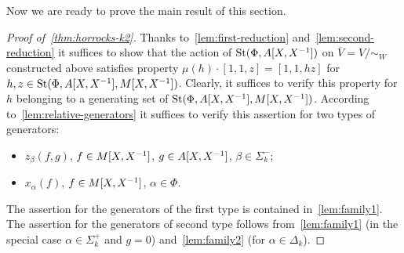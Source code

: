 Now we are ready to prove the main result of this section.
\begin{proof}[Proof of~\cref{thm:horrocks-k2}]
    Thanks to~\cref{lem:first-reduction} and~\cref{lem:second-reduction} it suffices to show that the action of
    $\operatorname{St}(\Phi, A[X, X^{-1}])$ on $\overline{V} = V/\sim_W$ constructed above satisfies property
    $\mu(h) \cdot [1, 1, z] = [1, 1, hz]$ for $h, z \in \operatorname{St}(\Phi, A[X, X^{-1}], M[X, X^{-1}])$.
    Clearly, it suffices to verify this property for $h$ belonging to a generating set of $\operatorname{St}(\Phi, A[X, X^{-1}], M[X, X^{-1}])$.
    According to~\cref{lem:relative-generators} it suffices to verify this assertion for two types of generators:
    \begin{itemize}
        \item $z_{\beta}(f, g)$, $f \in M[X, X^{-1}]$, $g \in A[X, X^{-1}]$, $\beta \in \Sigma_k^-$;
        \item $x_\alpha(f)$, $f \in M[X, X^{-1}]$, $\alpha \in \Phi$.
    \end{itemize}
    The assertion for the generators of the first type is contained in~\cref{lem:family1}.
    The assertion for the generators of second type follows from~\cref{lem:family1} (in the special case $\alpha \in \Sigma_k^+$ and $g = 0$) and~\cref{lem:family2} (for $\alpha \in \Delta_k$).
\end{proof}


